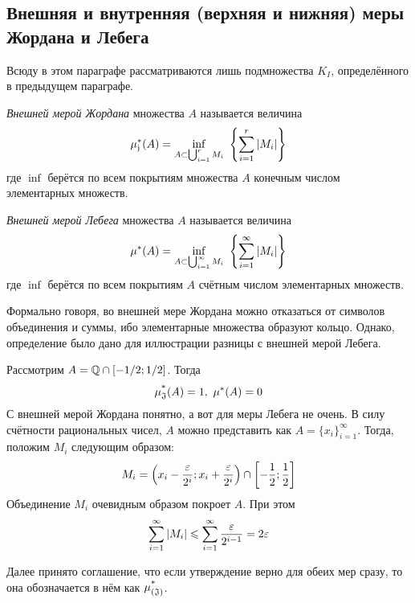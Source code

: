 \subsection{Внешняя и внутренняя (верхняя и нижняя) меры Жордана и Лебега}

\begin{note}
	Всюду в этом параграфе рассматриваются лишь подмножества $K_I$, определённого в предыдущем параграфе.
\end{note}

\begin{definition}
	\textit{Внешней мерой Жордана} множества $A$ называется величина
	\[
		\mu^*_\mathfrak{j}(A) = \inf_{A \subset \bigcup_{i = 1}^r M_i} \ \left\{\sum\limits_{i = 1}^r |M_i|\right\}
	\]
	где $\inf$ берётся по всем покрытиям множества $A$ конечным числом элементарных множеств.
\end{definition}

\begin{definition}
	\textit{Внешней мерой Лебега} множества $A$ называется величина
	\[
		\mu^*(A) = \inf_{A \subset \bigcup_{i = 1}^\infty M_i} \ \left\{\sum\limits_{i = 1}^\infty |M_i|\right\}
	\]
	где $\inf$ берётся по всем покрытиям $A$ счётным числом элементарных множеств.
\end{definition}

\begin{note}
	Формально говоря, во внешней мере Жордана можно отказаться от символов объединения и суммы, ибо элементарные множества образуют кольцо. Однако, определение было дано для иллюстрации разницы с внешней мерой Лебега.
\end{note}

\begin{example}
	Рассмотрим $A = \mathbb{Q} \cap [-1/2; 1/2]$. Тогда
	\[
		\operatorname{\mu^*_\mathfrak{J}}(A) = 1,\ \mu^*(A) = 0
	\]
	С внешней мерой Жордана понятно, а вот для меры Лебега не очень. В силу счётности рациональных чисел, $A$ можно представить как $A = \{x_i\}_{i = 1}^\infty$. Тогда, положим $M_i$ следующим образом:
	\[
		M_i = \left(x_i - \frac{\varepsilon}{2^i}; x_i + \frac{\varepsilon}{2^i}\right) \cap \left[-\frac{1}{2}; \frac{1}{2}\right]
	\]
	Объединение $M_i$ очевидным образом покроет $A$. При этом
	\[
		\sum\limits_{i = 1}^\infty |M_i| \leqslant \sum\limits_{i = 1}^\infty \frac{\varepsilon}{2^{i - 1}} = 2\varepsilon
	\]
\end{example}

\begin{note}
	Далее принято соглашение, что если утверждение верно для обеих мер сразу, то она обозначается в нём как $\operatorname{\mu^*_{(\mathfrak{J})}}$.
\end{note}

